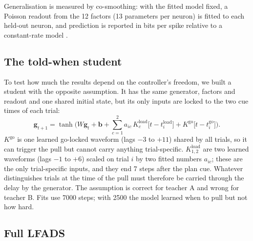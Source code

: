 \documentclass[11pt,a4paper]{article}
\newcommand{\vect}[1]{\bm{#1}}
\begin{document}
Generalisation is measured by co-smoothing: with the fitted model fixed, a Poisson readout from the 12 factors (13 parameters per neuron) is fitted to each held-out neuron, and prediction is reported in bits per spike relative to a constant-rate model \citep{pei2021}.

\subsection{The told-when student}\label{sec:toldwhen}

To test how much the results depend on the controller's freedom, we built a student with the opposite assumption. It has the same generator, factors and readout and one shared initial state, but its only inputs are locked to the two cue times of each trial:
\begin{equation}
  \vect g_{t+1} = \tanh\!\Big(W \vect g_t + \vect b + \sum_{c=1}^{2} a_{ic}\, K^{\mathrm{load}}_c\big[t - t^{\mathrm{load}}_i\big] + K^{\mathrm{go}}\big[t - t^{\mathrm{go}}_i\big]\Big).
\end{equation}
$K^{\mathrm{go}}$ is one learned go-locked waveform (lags $-3$ to $+11$) shared by all trials, so it can trigger the pull but cannot carry anything trial-specific. $K^{\mathrm{load}}_{1,2}$ are two learned waveforms (lags $-1$ to $+6$) scaled on trial $i$ by two fitted numbers $a_{ic}$; these are the only trial-specific inputs, and they end 7 steps after the plan cue. Whatever distinguishes trials at the time of the pull must therefore be carried through the delay by the generator. The assumption is correct for teacher A and wrong for teacher B. Fits use 7000 steps; with 2500 the model learned when to pull but not how hard.

\subsection{Full LFADS}\label{sec:lfads}
\end{document}
